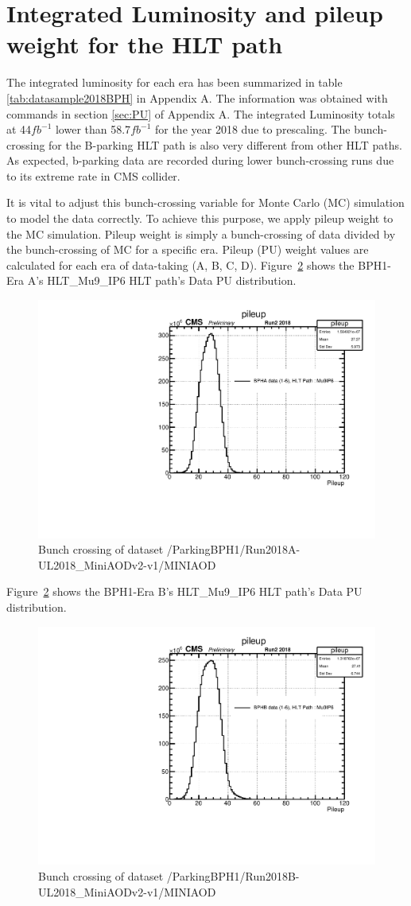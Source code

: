\section{Integrated Luminosity and pileup weight for the HLT path}
The integrated luminosity for each era has been summarized in table \ref{tab:datasample2018BPH} in Appendix A.
The information was obtained with commands in section \ref{sec:PU} of Appendix A.
The integrated Luminosity totals at 44$fb^{-1}$ lower than 58.7$fb^{-1}$ for the year 2018 due to prescaling.
The bunch-crossing for the B-parking HLT path is also very different from other HLT paths.
As expected, b-parking data are recorded during lower bunch-crossing runs due to its extreme rate in CMS collider.

It is vital to adjust this bunch-crossing variable for Monte Carlo (MC) simulation to model the data correctly.
To achieve this purpose, we apply pileup weight to the MC simulation.
Pileup weight is simply a bunch-crossing of data divided by the bunch-crossing of MC for a specific era.
Pileup (PU) weight values are calculated for each era of data-taking (A, B, C, D).
Figure~\ref{fig:EraAData} shows the BPH1-Era A's HLT\_Mu9\_IP6 HLT path's Data PU distribution.
\begin{figure}[h!]
  \caption{Bunch crossing of dataset /ParkingBPH1/Run2018A-UL2018\_MiniAODv2-v1/MINIAOD}
  \label{fig:EraAData}
  \centering
  \includegraphics[width=0.67\linewidth]{figs/NVtx_BPHA.pdf}

\end{figure}

Figure~\ref{fig:EraAData} shows the BPH1-Era B's HLT\_Mu9\_IP6 HLT path's Data PU distribution.
\begin{figure}[h!]
  \caption{Bunch crossing of dataset /ParkingBPH1/Run2018B-UL2018\_MiniAODv2-v1/MINIAOD}
  \label{fig:EraAData}
  \centering
  \includegraphics[width=0.67\linewidth]{figs/NVtx_BPHB.pdf}

\end{figure}

